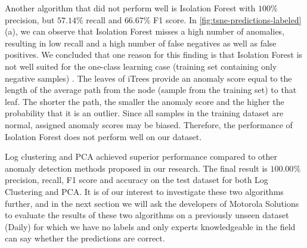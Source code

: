 Another algorithm that did not perform well is Isolation Forest with $100\%$ precision, but $57.14\%$ recall and $66.67\%$ F1 score. In \ref{fig:tsne-predictions-labeled} (a), we can observe that Isolation Forest misses a high number of anomalies, resulting in low recall and a high number of false negatives as well as false positives. We concluded that one reason for this finding is that Isolation Forest is not well suited for the one-class learning case (training set containing only negative samples) \cite{adForest}. The leaves of iTrees provide an anomaly score equal to the length of the average path from the node (sample from the training set) to that leaf. The shorter the path, the smaller the anomaly score and the higher the probability that it is an outlier. Since all samples in the training dataset are normal, assigned anomaly scores may be biased. Therefore, the performance of Isolation Forest does not perform well on our dataset.

Log clustering and PCA achieved superior performance compared to other anomaly detection methods proposed in our research. The final result is $100.00\%$ precision, recall, F1 score and accuracy on the test dataset for both Log Clustering and PCA. It is of our interest to investigate these two algorithms further, and in the next section we will ask the developers of Motorola Solutions to evaluate the results of these two algorithms on a previously unseen dataset (Daily) for which we have no labels and only experts knowledgeable in the field can say whether the predictions are correct.  

